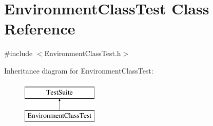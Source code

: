 \hypertarget{classEnvironmentClassTest}{\section{Environment\-Class\-Test Class Reference}
\label{classEnvironmentClassTest}
}


{\ttfamily \#include $<$Environment\-Class\-Test.\-h$>$}

Inheritance diagram for Environment\-Class\-Test\-:\begin{figure}[H]
\begin{center}
\leavevmode
\includegraphics[height=2.000000cm]{classEnvironmentClassTest}
\end{center}
\end{figure}
